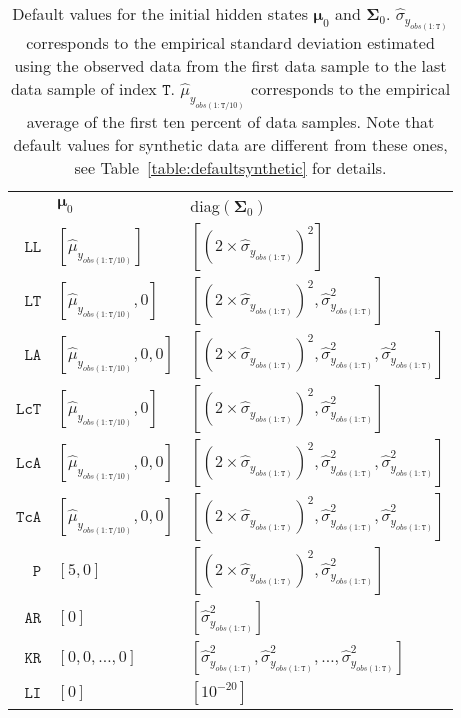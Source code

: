 \begin{table}[h]\centering
  \caption{Default values for the initial hidden states $\bm{\mu}_{0}$ and $\mathbf{\Sigma}_{0}$.   $\hat{\sigma}_{y_{obs(1:\mathtt{T})}}$ corresponds to the empirical standard deviation estimated using the observed data from the first data sample to the last data sample of index $\mathtt{T}$.   $\hat{\mu}_{y_{obs(1:\mathtt{T}/10)}}$ corresponds to the empirical average of the first ten percent of data samples. Note that default values for synthetic data are different from these ones, see Table~\ref{table:defaultsynthetic} for details. } 
     \begin{tabular}{r|ll}\toprule
        & $\bm{\mu}_{0}$ & diag$(\mathbf{\Sigma}_{0})$ \\ \cmidrule(lr){1-3}
       $ \mathtt{LL}$ & $[\hat{\mu}_{y_{obs(1:\mathtt{T}/10)}}]$ & $[(2\times\hat{\sigma}_{y_{obs(1:\mathtt{T})}})^{2}]$\\
        $ \mathtt{LT}$ & $[\hat{\mu}_{y_{obs(1:\mathtt{T}/10)}}, 0]$ & $[(2\times\hat{\sigma}_{y_{obs(1:\mathtt{T})}})^{2}, \hat{\sigma}_{y_{obs(1:\mathtt{T})}}^{2}]$\\
        $ \mathtt{LA}$ & $[\hat{\mu}_{y_{obs(1:\mathtt{T}/10)}}, 0, 0]$ & $[(2\times\hat{\sigma}_{y_{obs(1:\mathtt{T})}})^{2}, \hat{\sigma}_{y_{obs(1:\mathtt{T})}}^{2},  \hat{\sigma}_{y_{obs(1:\mathtt{T})}}^{2}]$\\
        $ \mathtt{LcT}$ & $[\hat{\mu}_{y_{obs(1:\mathtt{T}/10)}}, 0]$ & $[(2\times\hat{\sigma}_{y_{obs(1:\mathtt{T})}})^{2}, \hat{\sigma}_{y_{obs(1:\mathtt{T})}}^{2}]$\\
        $ \mathtt{LcA}$ & $[\hat{\mu}_{y_{obs(1:\mathtt{T}/10)}}, 0, 0]$ & $[(2\times\hat{\sigma}_{y_{obs(1:\mathtt{T})}})^{2}, \hat{\sigma}_{y_{obs(1:\mathtt{T})}}^{2},  \hat{\sigma}_{y_{obs(1:\mathtt{T})}}^{2}]$\\
        $ \mathtt{TcA}$ & $[\hat{\mu}_{y_{obs(1:\mathtt{T}/10)}}, 0, 0]$ & $[(2\times\hat{\sigma}_{y_{obs(1:\mathtt{T})}})^{2}, \hat{\sigma}_{y_{obs(1:\mathtt{T})}}^{2},  \hat{\sigma}_{y_{obs(1:\mathtt{T})}}^{2}]$\\
        $ \mathtt{P}$ & $[5, 0]$ & $[(2\times\hat{\sigma}_{y_{obs(1:\mathtt{T})}})^{2}, \hat{\sigma}_{y_{obs(1:\mathtt{T})}}^{2}]$\\
        $ \mathtt{AR}$ & $[0]$ & $[\hat{\sigma}_{y_{obs(1:\mathtt{T})}}^{2}]$\\
        $ \mathtt{KR}$ & $[0, 0, \dots, 0]$ & $[\hat{\sigma}_{y_{obs(1:\mathtt{T})}}^{2}, \hat{\sigma}_{y_{obs(1:\mathtt{T})}}^{2}, \dots,  \hat{\sigma}_{y_{obs(1:\mathtt{T})}}^{2}]$\\
        $ \mathtt{LI}$ & $[0]$ & $[10^{-20}]$\\\bottomrule
     \end{tabular}
   \label{table:defaultreal}
\end{table}



